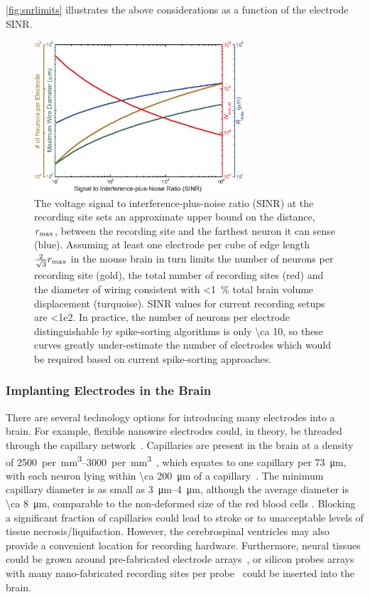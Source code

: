 \autoref{fig:snrlimits} illustrates the above considerations as a function of the electrode SINR.

\begin{figure}[htbp]
\caption{
The voltage signal to interference-plus-noise ratio (SINR) at the recording site sets an approximate upper bound on the distance, $r_{\text{\scriptsize max}}$, between the recording site and the farthest neuron it can sense (blue).
Assuming at least one electrode per cube of edge length $\frac{2}{\sqrt{3}}r_{\text{\scriptsize max}}$ in the mouse brain in turn limits the number of neurons per recording site (gold), the total number of recording sites (red) and the diameter of wiring consistent with \SI{<1}{\percent} total brain volume displacement (turquoise).
SINR values for current recording setups are \num{<1e2}.
In practice, the number of neurons per electrode distinguishable by spike-sorting algorithms is only \num{\ca 10}, so these curves greatly under-estimate the number of electrodes which would be required based on current spike-sorting approaches.
}
\label{fig:snrlimits}
\centering
\includegraphics[width=0.7\textwidth]{figs/Fig3.eps}
\end{figure}

\subsubsection{Implanting Electrodes in the Brain}

There are several technology options for introducing many electrodes into a brain.
For example, flexible nanowire electrodes could, in theory, be threaded through the capillary network~\cite{llinas05}.
Capillaries are present in the brain at a density of \SIrange{2500}{3000}{per \milli\meter\cubed}~\cite{schmidt89}, which equates to one capillary per \SI{73}{\micro\meter}, with each neuron lying within \SI{\ca 200}{\micro\meter} of a capillary~\cite{loffredo08}. The minimum capillary diameter is as small as \SIrange{3}{4}{\micro\meter}, although the average diameter is \SI{\ca 8}{\micro\meter}, comparable to the non-deformed size of the red blood cells \cite{Freitas1999}. Blocking a significant fraction of capillaries could lead to stroke or to unacceptable levels of tissue necrosis/liquifaction.
However, the cerebrospinal ventricles may also provide a convenient location for recording hardware. Furthermore, neural tissues could be grown around pre-fabricated electrode arrays~\cite{jadhav12}, or silicon probes arrays with many nano-fabricated recording sites per probe~\cite{du11} could be inserted into the brain.

